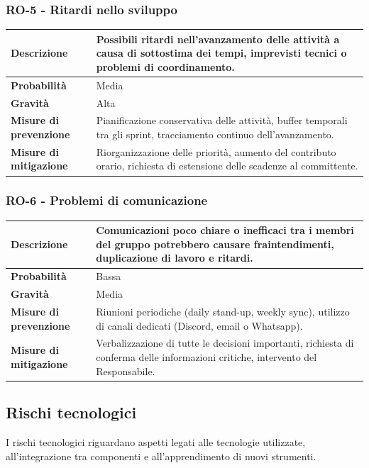 \documentclass[11pt,a4paper]{article}
\begin{document}
\subsubsection{RO-5 - Ritardi nello sviluppo}
\begin{center}
\begin{tabular}{|p{3cm}|p{12cm}|}
    \hline
    \textbf{Descrizione} & Possibili ritardi nell'avanzamento delle attività a causa di sottostima dei tempi, imprevisti tecnici o problemi di coordinamento. \\
    \hline
    \textbf{Probabilità} & Media \\
    \hline
    \textbf{Gravità} & Alta \\
    \hline
    \textbf{Misure di prevenzione} & Pianificazione conservativa delle attività, buffer temporali tra gli sprint, tracciamento continuo dell'avanzamento. \\
    \hline
    \textbf{Misure di mitigazione} & Riorganizzazione delle priorità, aumento del contributo orario, richiesta di estensione delle scadenze al committente. \\
    \hline
\end{tabular}
\end{center}

\subsubsection{RO-6 - Problemi di comunicazione}
\begin{center}
\begin{tabular}{|p{3cm}|p{12cm}|}
    \hline
    \textbf{Descrizione} & Comunicazioni poco chiare o inefficaci tra i membri del gruppo potrebbero causare fraintendimenti, duplicazione di lavoro e ritardi. \\
    \hline
    \textbf{Probabilità} & Bassa \\
    \hline
    \textbf{Gravità} & Media \\
    \hline
    \textbf{Misure di prevenzione} & Riunioni periodiche (daily stand-up, weekly sync), utilizzo di canali dedicati (Discord, email o Whatsapp). \\
    \hline
    \textbf{Misure di mitigazione} & Verbalizzazione di tutte le decisioni importanti, richiesta di conferma delle informazioni critiche, intervento del Responsabile. \\
    \hline
\end{tabular}
\end{center}

\subsection{Rischi tecnologici}
I rischi tecnologici riguardano aspetti legati alle tecnologie utilizzate, all'integrazione tra componenti e all'apprendimento di nuovi strumenti.
\end{document}
